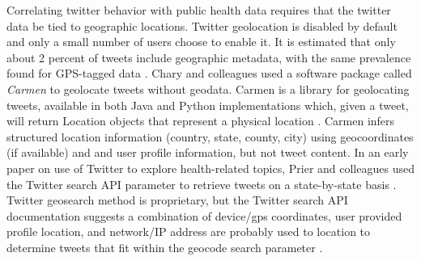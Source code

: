 \documentclass[sigconf]{acmart}
\begin{document}
Correlating twitter behavior with public health data requires that the twitter 
data be tied to geographic locations. Twitter geolocation is disabled by 
default and only a small number of users choose to enable it. It is estimated 
that only about 2 percent of tweets include geographic metadata, with the 
same prevalence found for GPS-tagged data \cite{chary17, leetaru13}. 
Chary and colleagues used a software package called \emph{Carmen} to geolocate 
tweets without geodata. Carmen is a library for geolocating tweets, available 
in both Java and Python implementations which, given a tweet, will return 
Location objects that represent a physical location \cite{dredze13}. Carmen 
infers structured location information (country, state, county, city) using 
geocoordinates (if available) and and user profile information, but not tweet 
content. In an early paper on use of Twitter to explore health-related topics, 
Prier and colleagues used the Twitter search API parameter to retrieve tweets 
on a state-by-state basis \cite{prier11}. Twitter geosearch method is 
proprietary, but the Twitter search API documentation suggests a combination 
of device/gps coordinates, user provided profile location, and network/IP 
address are probably used to location to determine tweets that fit within 
the geocode search parameter \cite{twitterGet}.

\end{document}
